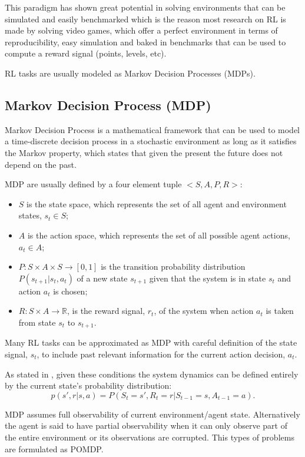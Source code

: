 This paradigm has shown great potential in solving environments that can be simulated and easily benchmarked which is the reason most research on \acrshort{RL} is made by solving video games, which offer a perfect environment in terms of reproducibility, easy simulation and baked in benchmarks that can be used to compute a reward signal (points, levels, etc).

\acrshort{RL} tasks are usually modeled as Markov Decision Processes (\acrshort{MDP}s).

\subsection{Markov Decision Process (MDP)}
\noindent Markov Decision Process is a mathematical framework that can be used to model a time-discrete decision process in a stochastic environment as long as it satisfies the Markov property, which states that given the present the future does not depend on the past.

\acrshort{MDP} are usually defined by a four element tuple $<S, A, P, R>$:
\begin{itemize}
    \item $S$ is the state space, which represents the set of all agent and environment states, $s_t \in S$;
    \item $A$ is the action space, which represents the set of all possible agent actions, $a_t \in A$;
    \item $P:S \times A \times S \rightarrow [0, 1]$ is the transition probability distribution $P(s_{t+1}|s_t,a_t)$ of a new state $s_{t+1}$ given that the system is in state $s_t$ and action $a_t$ is chosen;
    \item $R:S\times A \rightarrow \mathbb{R}$, is the reward signal, $r_t$, of the system when action $a_t$ is taken from state $s_t$ to $s_{t+1}$.
\end{itemize}

Many \acrshort{RL} tasks can be approximated as \acrshort{MDP} with careful definition of the state signal, $s_t$, to include past relevant information for the current action decision, $a_t$.

As stated in \cite{RLbook}, given these conditions the system dynamics can be defined entirely by the current state's probability distribution:
\begin{equation}
p(s', r|s, a) = P(S_t=s', R_t=r|S_{t-1}=s, A_{t-1}=a).
\end{equation}

\acrshort{MDP} assumes full observability of current environment/agent state. Alternatively the agent is said to have partial observability when it can only observe part of the entire environment or its observations are corrupted. This types of problems are formulated as \acrfull{POMDP}.

